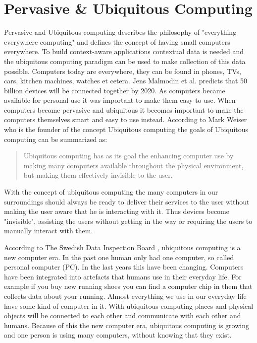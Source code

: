 \section{Pervasive \& Ubiquitous Computing}
Pervasive and Ubiquitous computing describes the philosophy of "everything everywhere computing" and defines the concept of having small computers everywhere. To build context-aware applications contextual data is needed and the ubiquitous computing paradigm can be used to make collection of this data possible.
Computers today are everywhere, they can be found in phones, TVs, cars, kitchen machines, watches et cetera. Jens Malmodin et al. \cite{fehske2011global} predicts that 50 billion devices will be connected together by 2020. As computers became available for personal use it was important to make them easy to use. When computers become pervasive and ubiquitous it becomes important to make the computers themselves smart and easy to use instead. According to Mark Weiser who is the founder of the concept Ubiquitous computing the goals of Ubiquitous computing can be summarized as: 

\begin{quotation}
	Ubiquitous computing has as its goal the enhancing computer use by making many computers available throughout the physical environment, but 	making them effectively invisible to the user. \cite{237456}
\end{quotation}

With the concept of ubiquitous computing the many computers in our surroundings should always be ready to deliver their services to the user without making the user aware that he is interacting with it. Thus devices become "invisible", assisting the users without getting in the way or requiring the users to manually interact with them. 

According to The Swedish Data Inspection Board \cite{datainspect}, ubiquitous computing is a new computer era. In the past one human only had one computer, so called personal computer (PC). In the last years this have been changing. Computers have been integrated into artefacts that humans use in their everyday life. For example if you buy new running shoes you can find a computer chip in them that collects data about your running. Almost everything we use in our everyday life have some kind of computer in it. With ubiquitous computing places and physical objects will be connected to each other and communicate with each other and humans. Because of this the new computer era, ubiquitous computing is growing and one person is using many computers, without knowing that they exist. 

